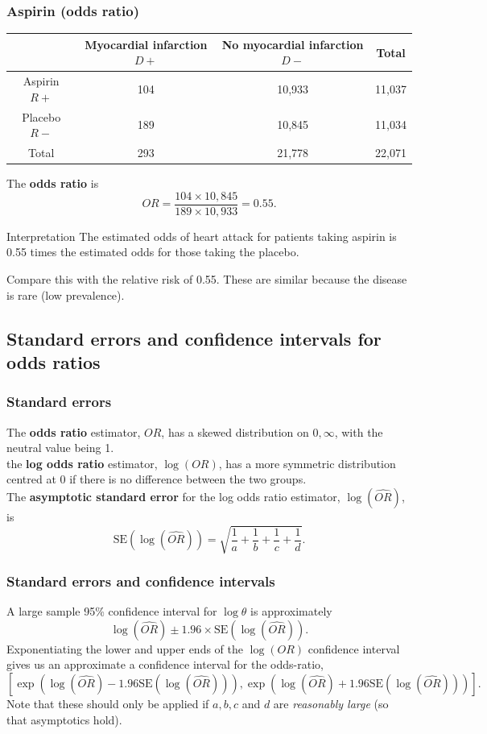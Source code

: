 \documentclass[a4paper]{article}\usepackage[]{graphicx}\usepackage[]{xcolor}
\begin{document}
\subsubsection{Aspirin (odds ratio)}
\begin{table}[H]
	\centering
	\begin{tabular}{@{}cccc@{}}
	\toprule
		             & Myocardial infarction \( D+ \)  & No myocardial infarction \( D- \)  & Total \\ \midrule
	Aspirin \( R+ \) & 104	                           & 10,933                             & 11,037 \\
	Placebo \( R- \) & 189                            & 10,845                            & 11,034 \\
	Total            & 293                             & 21,778	                            & 22,071 \\ \bottomrule
	\end{tabular}
\end{table}
The \textbf{odds ratio} is
\[
	OR = \frac{104 \times 10,845}{189\times 10,933} = 0.55.
\]
\begin{bluebox}{Interpretation}
	The estimated odds of heart attack for patients taking aspirin is 0.55 times the estimated odds for those taking the placebo.
\end{bluebox}
Compare this with the relative risk of 0.55. These are similar because the disease is rare (low prevalence).
\subsection{Standard errors and confidence intervals for odds ratios}
\subsubsection{Standard errors}
The \textbf{odds ratio} estimator, \( OR \), has a skewed distribution on \( 0,\infty \), with the neutral value being 1.\\
the \textbf{log odds ratio} estimator, \( \log(OR) \), has a more symmetric distribution centred at 0 if there is no difference between the two groups.\\
The \textbf{asymptotic standard error} for the log odds ratio estimator, \( \log(\widehat{OR}) \), is
\[
	\mathrm{SE}(\log(\widehat{OR})) = \sqrt{\frac{1}{a} + \frac{1}{b} + \frac{1}{c} + \frac{1}{d}}.
\]
\subsubsection{Standard errors and confidence intervals}
A large sample 95\% confidence interval for \( \log \theta \) is approximately
\[
	\log(\widehat{OR}) \pm 1.96 \times \mathrm{SE}(\log(\widehat{OR})).
\]
Exponentiating the lower and upper ends of the \( \log(OR) \) confidence interval gives us an approximate a confidence interval for the odds-ratio,
\[
	\left[ \exp\left( \log(\widehat{OR}) - 1.96 \mathrm{SE}(\log(\widehat{OR})) \right), \exp\left( \log(\widehat{OR}) + 1.96\mathrm{SE}(\log(\widehat{OR})) \right) \right].
\]
Note that these should only be applied if \( a,b,c \) and \( d \) are \textit{reasonably large} (so that asymptotics hold).
\end{document}
